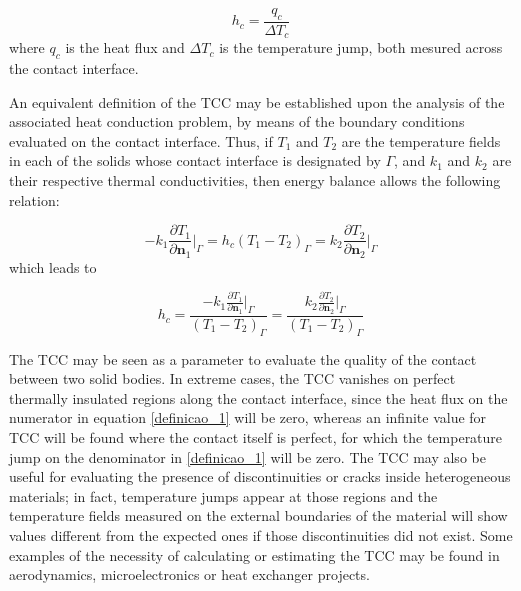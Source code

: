 \documentclass[conference,compsoc,fleqn]{IEEEtran}
\begin{document}
\begin{equation}
h_c = \frac{q_c}{\Delta T_c} \label{definicao_1}
\end{equation}
where $q_c$ is the heat flux and $\Delta T_c$ is the temperature jump, both mesured across the contact interface. 

An equivalent definition of the TCC may be established upon the analysis of the associated heat conduction problem, by means of the boundary conditions evaluated on the contact interface. Thus, if $T_1$ and $T_2$ are the temperature fields in each of the solids whose contact interface is designated by $\Gamma$, and  $k_1$ and $k_2$ are their respective thermal conductivities, then energy balance allows the following relation:

\begin{equation}
-k_1\frac{\partial T_1}{\partial \mathbf{n}_1}\bigg|_\Gamma
=
h_c(T_1 - T_2)_\Gamma
=
k_2\frac{\partial T_2}{\partial \mathbf{n}_2}\bigg|_\Gamma \label{definicao_2}
\end{equation}
which leads to

\begin{equation}
h_c = \frac{-k_1\displaystyle\frac{\partial T_1}{\partial \mathbf{n}_1}\bigg|_\Gamma}{(T_1 - T_2)_\Gamma} = \frac{k_2\displaystyle\frac{\partial T_2}{\partial \mathbf{n}_2}\bigg|_\Gamma}{(T_1 - T_2)_\Gamma} \label{definicao_3}
\end{equation}

The TCC may be seen as a parameter to evaluate the quality of the contact between two solid bodies. In extreme cases, the TCC vanishes on perfect thermally insulated regions along the contact interface, since the heat flux on the numerator in equation \eqref{definicao_1} will be zero, whereas an infinite value for TCC will be found where the contact itself is perfect, for which the temperature jump on the denominator in \eqref{definicao_1} will be zero. The TCC may also be useful for evaluating the presence of discontinuities or cracks inside heterogeneous materials; in fact, temperature jumps appear at those regions and the temperature fields measured on the external boundaries of the material will show values different from the expected ones if those discontinuities did not exist. Some examples of the necessity of calculating or estimating the TCC may be found in aerodynamics\cite{artigo_aerospacial}, microelectronics\cite{artigo_snaith} or heat exchanger projects\cite{artigo_huang}. 
\end{document}
